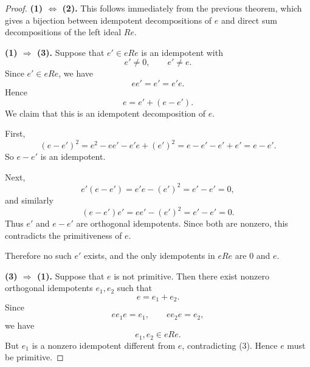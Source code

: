 \begin{proof}
    \textbf{(1) \(\Longleftrightarrow\) (2).}
    This follows immediately from the previous theorem, which gives a bijection between
    idempotent decompositions of $e$ and direct sum decompositions of the left ideal $Re$.

    \medskip

    \textbf{(1) \(\Longrightarrow\) (3).}
    Suppose that $e' \in eRe$ is an idempotent with
    \[
        e' \neq 0, \qquad e' \neq e.
    \]
    Since $e' \in eRe$, we have
    \[
        ee' = e' = e'e.
    \]
    Hence
    \[
        e = e' + (e-e').
    \]
    We claim that this is an idempotent decomposition of $e$.

    First,
    \[
        (e-e')^2 = e^2 - ee' - e'e + (e')^2
        = e - e' - e' + e'
        = e - e'.
    \]
    So $e-e'$ is an idempotent.

    Next,
    \[
        e'(e-e') = e'e - (e')^2 = e' - e' = 0,
    \]
    and similarly
    \[
        (e-e')e' = ee' - (e')^2 = e' - e' = 0.
    \]
    Thus $e'$ and $e-e'$ are orthogonal idempotents. Since both are nonzero, this contradicts
    the primitiveness of $e$.

    Therefore no such $e'$ exists, and the only idempotents in $eRe$ are $0$ and $e$.

    \medskip

    \textbf{(3) \(\Longrightarrow\) (1).}
    Suppose that $e$ is not primitive. Then there exist nonzero orthogonal idempotents
    $e_1,e_2$ such that
    \[
        e = e_1 + e_2.
    \]
    Since
    \[
        ee_1e = e_1, \qquad ee_2e = e_2,
    \]
    we have
    \[
        e_1,e_2 \in eRe.
    \]
    But $e_1$ is a nonzero idempotent different from $e$, contradicting (3). Hence $e$ must be
    primitive.
\end{proof}

